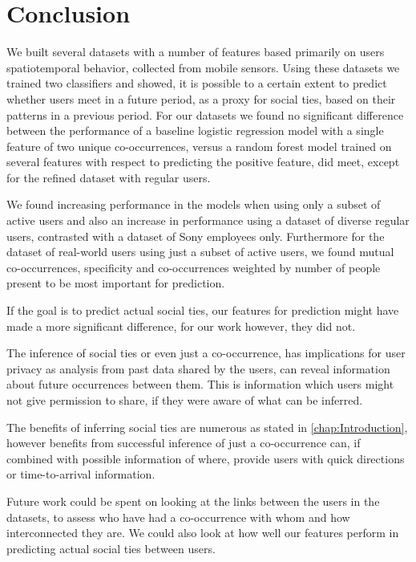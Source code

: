 \chapter{Conclusion}
\label{chap:conclusion}
We built several datasets with a number of features based primarily on users spatiotemporal behavior, collected from mobile sensors. Using these datasets we trained two classifiers and showed, it is possible to a certain extent to predict whether users meet in a future period, as a proxy for social ties, based on their patterns in a previous period. For our datasets we found no significant difference between the performance of a baseline logistic regression model with a single feature of two unique co-occurrences, versus a random forest model trained on several features with respect to predicting the positive feature, did meet, except for the refined dataset with regular users.

We found increasing performance in the models when using only a subset of active users and also an increase in performance using a dataset of diverse regular users, contrasted with a dataset of Sony employees only. Furthermore for the dataset of real-world users using just a subset of active users, we found mutual co-occurrences, specificity and co-occurrences weighted by number of people present to be most important for prediction.

If the goal is to predict actual social ties, our features for prediction might have made a more significant difference, for our work however, they did not.

The inference of social ties or even just a co-occurrence, has implications for user privacy as analysis from past data shared by the users, can reveal information about future occurrences between them. This is information which users might not give permission to share, if they were aware of what can be inferred.

The benefits of inferring social ties are numerous as stated in \autoref{chap:Introduction}, however benefits from successful inference of just a co-occurrence can, if combined with possible information of where, provide users with quick directions or time-to-arrival information.

Future work could be spent on looking at the links between the users in the datasets, to assess who have had a co-occurrence with whom and how interconnected they are. We could also look at how well our features perform in predicting actual social ties between users.